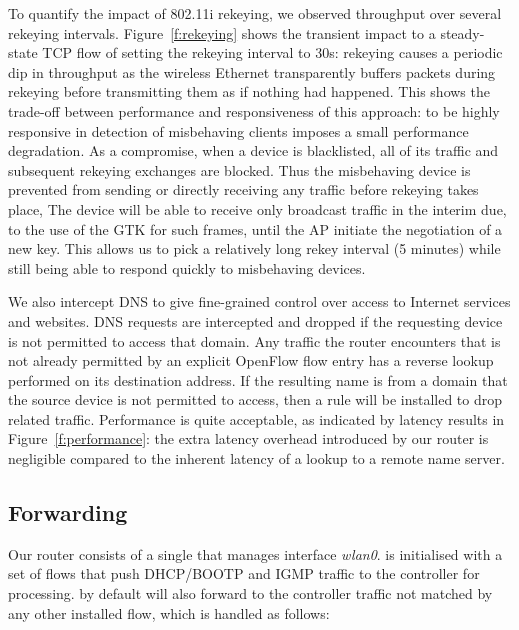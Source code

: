 To quantify the impact of 802.11i rekeying, we observed throughput over several
rekeying intervals.  Figure~\ref{f:rekeying} shows the transient impact to a
steady-state TCP flow of setting the
rekeying interval to 30s: rekeying causes a periodic dip in throughput as the
wireless Ethernet transparently buffers packets during rekeying before
transmitting them as if nothing had happened.  This shows the trade-off between
performance and responsiveness of this approach: to be highly responsive in
detection of misbehaving clients imposes a small performance degradation.  As a
compromise, when a device is blacklisted, all of its traffic and subsequent
rekeying exchanges are blocked.  Thus the misbehaving device is prevented from
sending or directly receiving any traffic before rekeying takes place, The
device will be able to receive only broadcast traffic in the interim due, to the
use of the GTK for such frames, until the AP initiate the negotiation of a new
key.  This allows us to pick a relatively long rekey interval (5 minutes) while
still being able to respond quickly to misbehaving devices.

We also intercept DNS to give fine-grained control over access to Internet
services and websites.  DNS requests are intercepted and dropped if the
requesting device is not permitted to access that domain.  Any traffic the
router encounters that is not already permitted by an explicit OpenFlow flow
entry has a reverse lookup performed on its destination address.  If the
resulting name is from a domain that the source device is not permitted to
access, then a rule will be installed to drop related traffic.  Performance is
quite acceptable, as indicated by latency results in Figure~\ref{f:performance}:
the extra latency overhead introduced by our router is negligible compared to
the inherent latency of a lookup to a remote name server.  

\subsection{Forwarding} \label{s:forwarding}
 
Our router consists of a single \ovs that manages interface
\emph{wlan0}.  \ovs is initialised with a set of flows that push
DHCP/BOOTP and IGMP traffic to the controller for processing.
\ovs by default will also forward to the controller traffic not matched
by any other installed flow, which is handled as follows:

